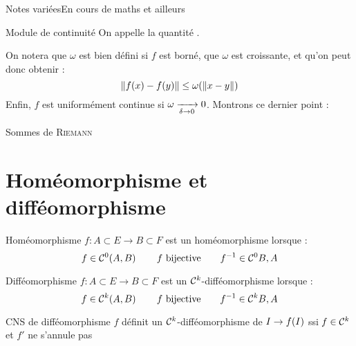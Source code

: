 \documentclass[a4paper,french,bookmarks]{article}
\begin{document}
    \renewcommand{\thesection}{\Roman{section}}
    \renewcommand{\thesection}{\Roman{section}}
    \renewcommand{\labelenumi}{\Roman{section}.\arabic{enumi}.}
    \renewcommand*{\labelenumii}{\alph{enumii}.}

    {Notes variées}{En cours de maths et ailleurs}
    
    \begin{definition}{Module de continuité}{}
        On appelle  la quantité .
    \end{definition}
    On notera que $\omega$ est bien défini si $f$ est borné, que $\omega$ est croissante, et qu'on peut donc obtenir :
    \[ \lVert f\!\left(x\right) - f\!\left(y\right)\rVert \leq \omega \!\left(\lVert x - y\rVert\right)\]
    Enfin, $f$ est uniformément continue si $\omega \lima{\delta \to 0} 0$. Montrons ce dernier point :
    
    Sommes de \textsc{Riemann}
    
    \newpage
    
    \section{Homéomorphisme et difféomorphisme}
    
    \begin{definition}{Homéomorphisme}{}
        $f : A \subset E \rightarrow B \subset F$ est un homéomorphisme lorsque :
        \[ f \in \mathcal{C}^0\!\left(A, B\right) \qquad f \ \text{bijective} \qquad f^{-1} \in \mathcal{C}^0{B, A}\]
    \end{definition}
    
    \begin{definition}{Difféomorphisme}
        $f : A \subset E \rightarrow B \subset F$ est un $\mathcal{C}^k$-difféomorphisme lorsque :
        \[ f \in \bcC^k\p{A, B} \qquad f \ \text{bijective} \qquad f^{-1} \in \bcC^k{B, A}\]
    \end{definition}
    
    \begin{property}{CNS de difféomorphisme}{}
        $f$ définit un $\mathcal{C}^k$-difféomorphisme de $I \rightarrow f\!\left(I\right)$ ssi $f \in \mathcal{C}^k$ et $f'$ ne s'annule pas
    \end{property}
    
    
\end{document}
